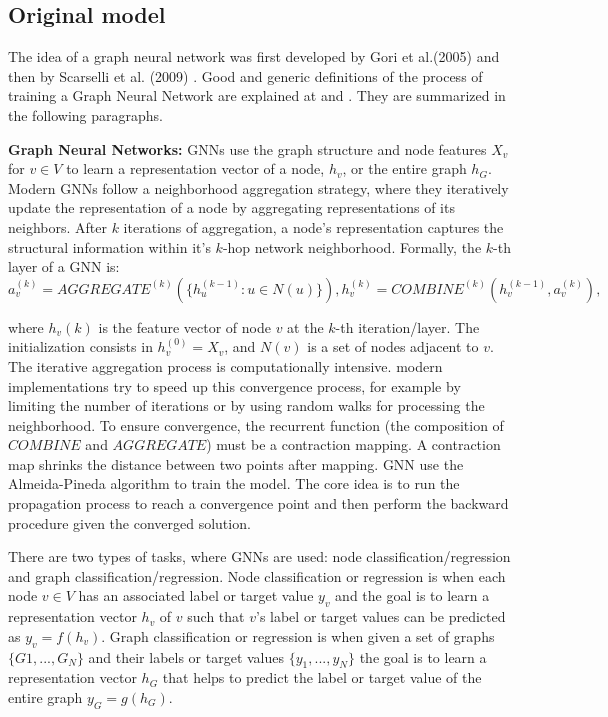 \subsection{Original model}


The idea of a graph neural network was first developed by Gori et al.(2005) \cite{gori} and then by Scarselli et al. (2009) \cite{scarcelli}. Good and generic definitions of the process of training a Graph Neural Network are explained at \cite{hamilton} and \cite{powerful}. They are summarized in the following paragraphs. 

\textbf{Graph Neural Networks:} GNNs use the graph structure and node features $X_v$ for $v \in V$ to learn a representation vector of a node, $h_v$, or the entire graph $h_{G}$. Modern GNNs follow a neighborhood aggregation strategy, where they iteratively update the representation of a node by aggregating representations of its neighbors. After $k$ iterations of aggregation, a node's representation captures the structural information within it's $k$-hop network neighborhood. Formally, the $k$-th layer of a GNN is:
$$ a_v^{(k)} = AGGREGATE^{(k)}(\{ h_u^{(k-1)} : u \in N(u) \}) , h_v^{(k)} = COMBINE^{(k)}(h_v^{(k-1)}, a_v^{(k)}),$$

where $h_v(k)$ is the feature vector of node $v$ at the $k$-th iteration/layer. The initialization consists in $h_v^{(0)} = X_v$, and $N(v)$ is a set of nodes adjacent to $v$. 
The iterative aggregation process is computationally intensive. modern implementations try to speed up this convergence process, for example by limiting the number of iterations or by using random walks for processing the neighborhood.  To ensure convergence, the recurrent function (the composition of $COMBINE$ and $AGGREGATE$) must be a contraction mapping. A contraction map shrinks the distance between two points after mapping. GNN use the Almeida-Pineda algorithm \cite{AlmeidaPineda} to train the model. The core idea is to run the propagation process to reach a convergence point and then perform the backward procedure given the converged solution.

There are two types of tasks, where GNNs are used: node classification/regression and graph classification/regression.  Node classification or regression is when each node $v \in V$ has an associated label or target value $y_v$ and the goal is to learn a representation vector $h_v$ of $v$ such that $v$'s label or target values can be predicted as $y_v=f(h_v)$. Graph classification or regression is when given a set of graphs $\{ G1, ..., G_N\}$ and their labels or target values $\{y_1,...,y_N\}$ the goal is to learn a representation vector $h_G$ that helps to predict the label or target value of the entire graph $y_G=g(h_G)$.

